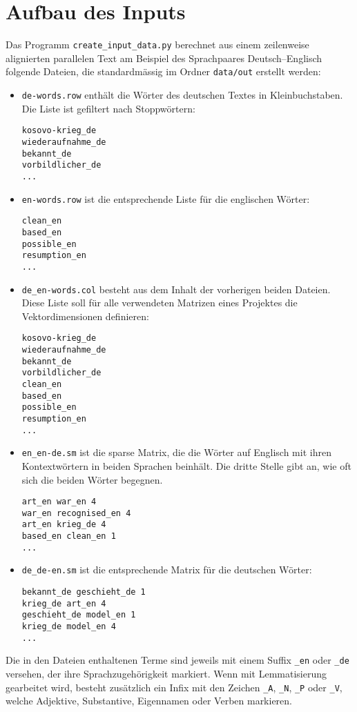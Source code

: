 \documentclass[11pt,twoside,openright]{mpreport}
\begin{document}
\section{Aufbau des Inputs}
\label{sec:input}
Das Programm \verb+create_input_data.py+ berechnet aus einem zeilenweise alignierten parallelen Text am Beispiel des Sprachpaares Deutsch--Englisch folgende Dateien, die standardmässig im Ordner \verb+data/out+ erstellt werden:
\begin{itemize}
\item \verb+de-words.row+ enthält die Wörter des deutschen Textes in Kleinbuchstaben. Die Liste ist gefiltert nach Stoppwörtern:
\begin{verbatim}
kosovo-krieg_de
wiederaufnahme_de
bekannt_de
vorbildlicher_de
...
\end{verbatim}
\item \verb+en-words.row+ ist die entsprechende Liste für die englischen Wörter:
\begin{verbatim}
clean_en
based_en
possible_en
resumption_en
...
\end{verbatim}
\item \verb+de_en-words.col+ besteht aus dem Inhalt der vorherigen beiden Dateien. Diese Liste soll für alle verwendeten Matrizen eines Projektes die Vektordimensionen definieren:
\begin{verbatim}
kosovo-krieg_de
wiederaufnahme_de
bekannt_de
vorbildlicher_de
clean_en
based_en
possible_en
resumption_en
...
\end{verbatim}
\item \verb+en_en-de.sm+ ist die sparse Matrix, die die Wörter auf Englisch mit ihren Kontextwörtern in beiden Sprachen beinhält. Die dritte Stelle gibt an, wie oft sich die beiden Wörter begegnen. 
\begin{verbatim}
art_en war_en 4
war_en recognised_en 4
art_en krieg_de 4
based_en clean_en 1
...
\end{verbatim}
\item \verb+de_de-en.sm+ ist die entsprechende Matrix für die deutschen Wörter:
\begin{verbatim}
bekannt_de geschieht_de 1
krieg_de art_en 4
geschieht_de model_en 1
krieg_de model_en 4
...
\end{verbatim}
\end{itemize}
Die in den Dateien enthaltenen Terme sind jeweils mit einem Suffix \verb+_en+ oder \verb+_de+ versehen, der ihre Sprachzugehörigkeit markiert. Wenn mit
Lemmatisierung gearbeitet wird, besteht zusätzlich ein Infix mit den Zeichen \verb+_A+, \verb+_N+, \verb+_P+ oder \verb+_V+, welche Adjektive, Substantive,
Eigennamen oder Verben markieren.
\end{document}
